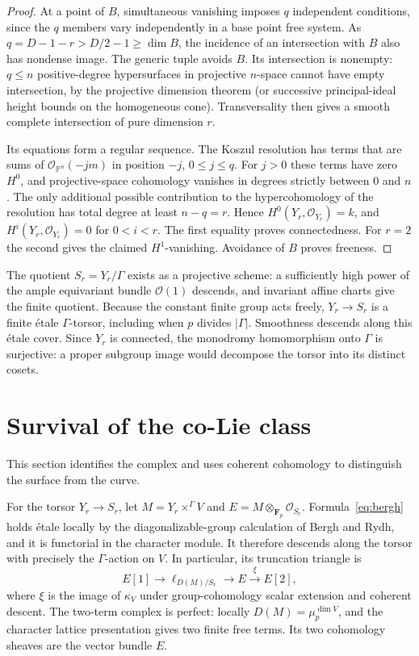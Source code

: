 \documentclass[11pt]{article}
\newcommand{\Fp}{\mathbf F_p}\newcommand{\OO}{\mathcal O}
\theoremstyle{definition}\newtheorem{definition}[theorem]{Definition}
\theoremstyle{remark}\newtheorem{remark}[theorem]{Remark}
\begin{document}
\begin{proof}
At a point of $B$, simultaneous vanishing imposes $q$ independent conditions, since the $q$ members vary independently in a base point free system. As $q=D-1-r>D/2-1\geq\dim B$, the incidence of an intersection with $B$ also has nondense image. The generic tuple avoids $B$. Its intersection is nonempty: $q\leq n$ positive-degree hypersurfaces in projective $n$-space cannot have empty intersection, by the projective dimension theorem (or successive principal-ideal height bounds on the homogeneous cone). Transversality then gives a smooth complete intersection of pure dimension $r$.

Its equations form a regular sequence. The Koszul resolution has terms that are sums of $\OO_{\mathbb P^n}(-jm)$ in position $-j$, $0\leq j\leq q$. For $j>0$ these terms have zero $H^0$, and projective-space cohomology vanishes in degrees strictly between $0$ and $n$. The only additional possible contribution to the hypercohomology of the resolution has total degree at least $n-q=r$. Hence $H^0(Y_r,\OO_{Y_r})=k$, and $H^i(Y_r,\OO_{Y_r})=0$ for $0<i<r$. The first equality proves connectedness. For $r=2$ the second gives the claimed $H^1$-vanishing. Avoidance of $B$ proves freeness.
\end{proof}

The quotient $S_r=Y_r/\Gamma$ exists as a projective scheme: a sufficiently high power of the ample equivariant bundle $\OO(1)$ descends, and invariant affine charts give the finite quotient. Because the constant finite group acts freely, $Y_r\to S_r$ is a finite \'etale $\Gamma$-torsor, including when $p$ divides $|\Gamma|$. Smoothness descends along this \'etale cover. Since $Y_r$ is connected, the monodromy homomorphism onto $\Gamma$ is surjective: a proper subgroup image would decompose the torsor into its distinct cosets.

\section{Survival of the co-Lie class}

This section identifies the complex and uses coherent cohomology to distinguish the surface from the curve.

For the torsor $Y_r\to S_r$, let $M=Y_r\times^\Gamma V$ and $E=M\otimes_{\Fp}\OO_{S_r}$. Formula~\eqref{eq:bergh} holds \'etale locally by the diagonalizable-group calculation of Bergh and Rydh, and it is functorial in the character module. It therefore descends along the torsor with precisely the $\Gamma$-action on $V$. In particular, its truncation triangle is
\begin{equation}\label{eq:triangle}
 E[1]\longrightarrow\ell_{D(M)/S_r}\longrightarrow E
              \xrightarrow{\xi}E[2],
\end{equation}
where $\xi$ is the image of $\kappa_V$ under group-cohomology scalar extension and coherent descent. The two-term complex is perfect: locally $D(M)=\mu_p^{\dim V}$, and the character lattice presentation gives two finite free terms. Its two cohomology sheaves are the vector bundle $E$.
\end{document}
